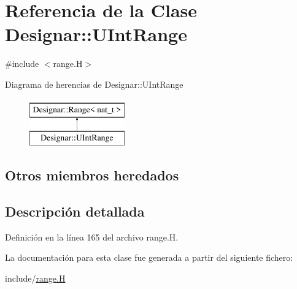 \hypertarget{class_designar_1_1_u_int_range}{}\section{Referencia de la Clase Designar\+:\+:U\+Int\+Range}
\label{class_designar_1_1_u_int_range}


{\ttfamily \#include $<$range.\+H$>$}

Diagrama de herencias de Designar\+:\+:U\+Int\+Range\begin{figure}[H]
\begin{center}
\leavevmode
\includegraphics[height=2.000000cm]{class_designar_1_1_u_int_range}
\end{center}
\end{figure}
\subsection*{Otros miembros heredados}


\subsection{Descripción detallada}


Definición en la línea 165 del archivo range.\+H.



La documentación para esta clase fue generada a partir del siguiente fichero\+:\begin{DoxyCompactItemize}
\item 
include/\hyperlink{range_8_h}{range.\+H}\end{DoxyCompactItemize}
